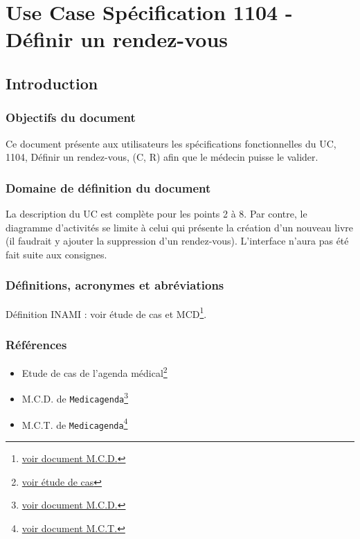\documentclass[a4paper, 11pt]{report}
\begin{document}

\tableofcontents

\chapter{Use Case Spécification 1104 - Définir un rendez-vous}

\section{Introduction}

\subsection{Objectifs du document}
Ce document présente aux utilisateurs les spécifications fonctionnelles du UC,
1104, Définir un rendez-vous, (C, R) afin que le médecin puisse le valider.

\subsection{Domaine de définition du document}
La description du UC est complète pour les points 2 à 8. Par contre, le
diagramme d’activités se limite à celui qui présente la création d’un nouveau 
livre (il faudrait y ajouter la suppression d’un rendez-vous). 
L'interface n'aura pas été fait suite aux consignes.

\subsection{Définitions, acronymes et abréviations}
Définition INAMI : voir étude de cas et MCD\footnote{\href{../MCD/MCD.pdf}{voir document M.C.D.}}.

\subsection{Références}
\begin{itemize}
	\item[] Etude de cas de l'agenda
		médical\footnote{\href{../Enonce_Travail_Synthese_14-15.pdf}{voir
		étude de cas}}
	\item[] M.C.D. de \texttt{Medicagenda}\footnote{\href{../MCD/MCD.pdf}{voir document M.C.D.}}
	\item[] M.C.T. de \texttt{Medicagenda}\footnote{\href{./MCT.pdf}{voir document M.C.T.}}
\end{itemize}
\newpage
\end{document}
